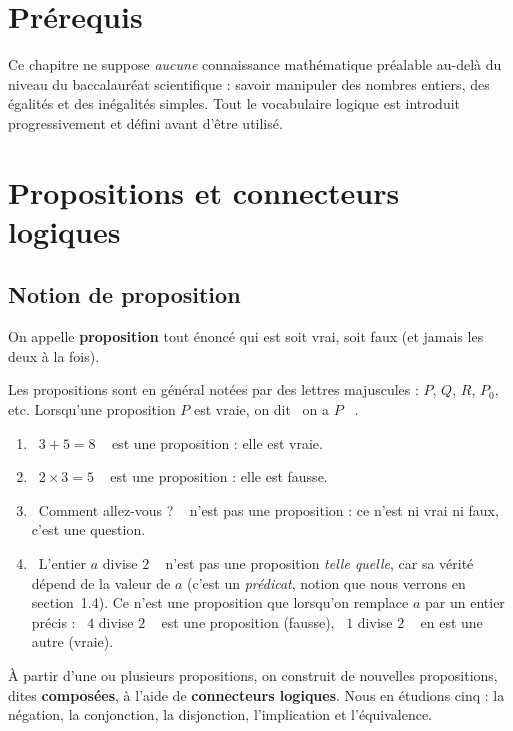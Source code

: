 \documentclass[a4paper,12pt,openany]{book}
\providecommand{\og}{\guillemotleft~}
\providecommand{\fg}{\ifhmode~\fi\guillemotright}
\begin{document}
\section{Prérequis}

Ce chapitre ne suppose \emph{aucune} connaissance mathématique préalable au-delà
du niveau du baccalauréat scientifique : savoir manipuler des nombres entiers,
des égalités et des inégalités simples. Tout le vocabulaire logique est
introduit progressivement et défini avant d'être utilisé.

\section{Propositions et connecteurs logiques}

\subsection{Notion de proposition}


\begin{definition}
On appelle \textbf{proposition} tout énoncé qui est soit vrai, soit faux (et
jamais les deux à la fois).
\end{definition}

Les propositions sont en général notées par des lettres majuscules : $P$, $Q$,
$R$, $P_0$, etc. Lorsqu'une proposition $P$ est vraie, on dit \og on a $P$ \fg.

\begin{exemple}
\begin{enumerate}
  \item \og $3+5=8$ \fg{} est une proposition : elle est vraie.
  \item \og $2\times 3 = 5$ \fg{} est une proposition : elle est fausse.
  \item \og Comment allez-vous ? \fg{} n'est pas une proposition : ce n'est ni
  vrai ni faux, c'est une question.
  \item \og L'entier $a$ divise $2$ \fg{} n'est pas une proposition \emph{telle
  quelle}, car sa vérité dépend de la valeur de $a$ (c'est un \emph{prédicat},
  notion que nous verrons en section~1.4). Ce n'est une proposition que
  lorsqu'on remplace $a$ par un entier précis : \og $4$ divise $2$ \fg{} est
  une proposition (fausse), \og $1$ divise $2$ \fg{} en est une autre (vraie).
\end{enumerate}
\end{exemple}


À partir d'une ou plusieurs propositions, on construit de nouvelles
propositions, dites \textbf{composées}, à l'aide de \textbf{connecteurs
logiques}. Nous en étudions cinq : la négation, la conjonction, la disjonction,
l'implication et l'équivalence.
\end{document}
